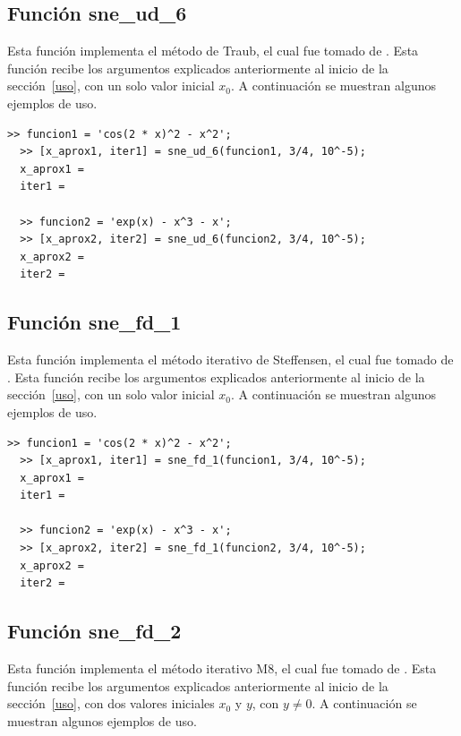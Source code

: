\documentclass[12pt]{article}
\begin{document}
\subsection{Función sne\_ud\_6}
Esta función implementa el método de Traub, el cual fue tomado de \cite{budzko2015new}. Esta función recibe los argumentos explicados anteriormente al inicio de la sección~\ref{uso}, con un solo valor inicial $x_{0}$. A continuación se muestran algunos ejemplos de uso.

\begin{minipage}{\linewidth}
\begin{lstlisting}[frame = single]
  >> funcion1 = 'cos(2 * x)^2 - x^2';
  >> [x_aprox1, iter1] = sne_ud_6(funcion1, 3/4, 10^-5);
  x_aprox1 = 
  iter1 = 

  >> funcion2 = 'exp(x) - x^3 - x';
  >> [x_aprox2, iter2] = sne_ud_6(funcion2, 3/4, 10^-5);
  x_aprox2 = 
  iter2 = 

\end{lstlisting}
\end{minipage}

\subsection{Función sne\_fd\_1}
Esta función implementa el método iterativo de Steffensen, el cual fue tomado de \cite{cordero2011class}. Esta función recibe los argumentos explicados anteriormente al inicio de la sección~\ref{uso}, con un solo valor inicial $x_{0}$. A continuación se muestran algunos ejemplos de uso.

\begin{minipage}{\linewidth}
\begin{lstlisting}[frame = single]
  >> funcion1 = 'cos(2 * x)^2 - x^2';
  >> [x_aprox1, iter1] = sne_fd_1(funcion1, 3/4, 10^-5);
  x_aprox1 = 
  iter1 = 

  >> funcion2 = 'exp(x) - x^3 - x';
  >> [x_aprox2, iter2] = sne_fd_1(funcion2, 3/4, 10^-5);
  x_aprox2 = 
  iter2 = 

\end{lstlisting}
\end{minipage}

\subsection{Función sne\_fd\_2}
Esta función implementa el método iterativo M8, el cual fue tomado de \cite{bakhtiari2017widening}. Esta función recibe los argumentos explicados anteriormente al inicio de la sección~\ref{uso}, con dos valores iniciales $x_{0}$ y $y$, con $y \neq 0$. A continuación se muestran algunos ejemplos de uso.
\end{document}
